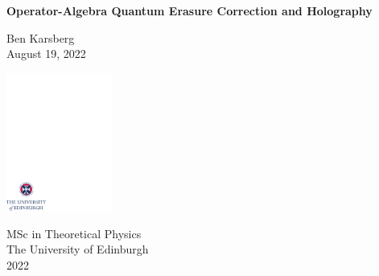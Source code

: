 \documentclass[12pt,a4paper]{report}
\numberwithin{equation}{section}
\theoremstyle{definition}
\theoremstyle{theorem}
\theoremstyle{theorem}
\theoremstyle{example}
\theoremstyle{definition}
\begin{document}
\thispagestyle{empty}

%

\parindent=0pt          %
\parskip=5pt            %


\vspace*{0.1\textheight}

\begin{center}
        \huge{\bfseries Operator-Algebra Quantum Erasure Correction and Holography}\\
\end{center}

\bigskip

\begin{center}
        \large{Ben Karsberg}\\  %
        \bigskip
        \large{August 19, 2022}  %
\end{center}


\vspace*{0.3\textheight}

\begin{center}
        \includegraphics[width=35mm]{crest.pdf}
\end{center}

\medskip

\begin{center}

\large{
  MSc in Theoretical Physics\\[0.8ex]
  The University of Edinburgh\\[0.8ex]
  2022
}

\end{center}
\end{document}
